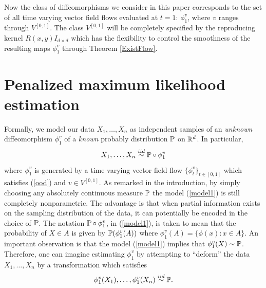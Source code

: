 \documentclass[noinfoline]{imsart}
\begin{document}
 Now the class of diffeomorphisms we consider in this paper  corresponds to the set of all time varying vector field flows evaluated at $t=1$: $\phi^v_1$, where $v$ ranges through $V^{[0,1]}$. The class $V^{[0,1]}$ will be completely specified by the reproducing kernel $R(x,y)I_{d\times d}$ which has the flexibility to control the smoothness of the resulting maps $\phi_1^v$ through Theorem \ref{ExistFlow}.
%
\section{Penalized maximum likelihood estimation}
\label{pmle}


Formally, we model our data   $X_1,\ldots, X_n$ as independent samples of an {\it unknown} diffeomorphism $\phi^v_1$ of a {\it known} probably distribution $\Bbb P$ on $\Bbb R^d$. In particular,
\begin{equation}
\label{model1} 
X_1,\ldots,X_n\overset{iid}\sim \Bbb P\circ \phi_1^v
\end{equation} 
where  $\phi^v_1$ is generated by a time varying vector field flow $\{\phi^v_t\}_{t\in[0,1]}$ which satisfies (\ref{ood}) and $v\in V^{[0,1]}$.
As remarked in the introduction, by simply choosing any absolutely continuous measure  $\Bbb P$ the
model (\ref{model1}) is still completely nonparametric.  The advantage is that when partial information exists on the sampling distribution of the data, it can potentially be encoded in the choice of $\Bbb P$.
The notation $\Bbb P\circ \phi^v_1$, in (\ref{model1}), is taken to mean that the probability of $X\in A$ is given by   $ \Bbb P(\phi^v_1(A))$ where $\phi_1^v(A)=\{ \phi(x)\colon x\in A \}$. An important observation is that the model (\ref{model1}) implies that $\phi_1^v(X)\sim \Bbb P$. Therefore, one can imagine estimating $\phi_1^v$ by attempting to ``deform'' the data $X_1,\ldots,X_n$ by a transformation which satisfies
\[ \phi_1^v(X_1),\ldots,\phi_1^v(X_n)\overset{iid}\sim \Bbb P. \]
\end{document}
